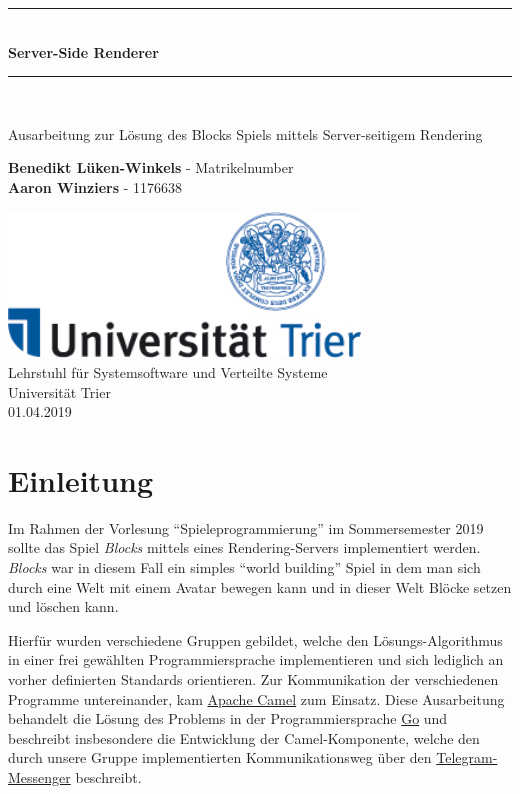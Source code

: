 \documentclass[11pt,parskip=full]{scrartcl}
\newcommand{\HRule}[1]{\rule{\linewidth}{#1}}
\begin{document}
\begin{titlepage}
  \begin{center}
    \vspace*{2cm}
    \HRule{1pt} \\
    \vspace{.5 cm}
    \textbf{\Huge Server-Side Renderer}
    \HRule{2pt} \\ [1cm]

    \vspace{1.5cm}

    \Large{
      Ausarbeitung zur Lösung des Blocks Spiels mittels Server-seitigem Rendering
    }
    \vspace{1.5cm}

    \textbf{\Large Benedikt Lüken-Winkels} - \large Matrikelnumber \\
    [3pt]
    \textbf{\Large Aaron Winziers} - \large 1176638

    \vfill

    \includegraphics[width=0.7\textwidth]{Logo-Uni-Trier}\\
    [1cm]
    Lehrstuhl für Systemsoftware und Verteilte Systeme\\
    Universität Trier\\
    01.04.2019

  \end{center}
\end{titlepage}
\newpage

\section{Einleitung}

Im Rahmen der Vorlesung ``Spieleprogrammierung'' im Sommersemester 2019 sollte das Spiel \textit{Blocks} mittels eines Rendering-Servers implementiert werden. \textit{Blocks} war in diesem Fall ein simples ``world building'' Spiel in dem man sich durch eine Welt mit einem Avatar bewegen kann und in dieser Welt Blöcke setzen und löschen kann.

Hierfür wurden verschiedene Gruppen gebildet, welche den Lösungs-Algorithmus in einer frei gewählten Programmiersprache implementieren und sich lediglich an vorher definierten Standards orientieren. Zur Kommunikation der verschiedenen Programme untereinander, kam \href{http://camel.apache.org/}{Apache Camel} zum Einsatz. Diese Ausarbeitung behandelt die Lösung des Problems in der Programmiersprache \href{https://golang.org/}{Go} und beschreibt insbesondere die Entwicklung der Camel-Komponente, welche den durch unsere Gruppe implementierten Kommunikationsweg über den \href{https://telegram.org/}{Telegram-Messenger} beschreibt.
\end{document}
